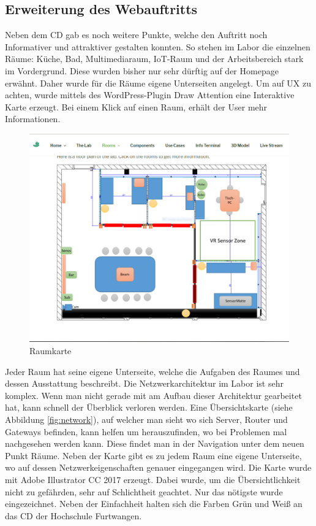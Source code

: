 \subsection{Erweiterung des Webauftritts}
Neben dem \acf{CD} gab es noch weitere Punkte, welche den Auftritt noch Informativer und attraktiver gestalten konnten. So stehen im Labor die einzelnen Räume: Küche, Bad, Multimediaraum, IoT-Raum und der Arbeitsbereich stark im Vordergrund. Diese wurden bisher nur sehr dürftig auf der Homepage erwähnt. Daher wurde für die Räume eigene Unterseiten angelegt. Um auf \acf{UX} zu achten, wurde mittels des WordPress-Plugin Draw Attention  eine Interaktive Karte erzeugt. Bei einem Klick auf einen Raum, erhält der User mehr Informationen. \autocite{WPDrawAttention.}

\begin{figure}[H]
	\centering
	\includegraphics[scale=0.35]{content/pictures/room.jpg}
	\caption{Raumkarte}
	\label{fig:room}
\end{figure}

Jeder Raum hat seine eigene Unterseite, welche die Aufgaben des Raumes und dessen Ausstattung beschreibt.
\newpage
Die Netzwerkarchitektur im Labor ist sehr komplex. Wenn man nicht gerade mit am Aufbau dieser Architektur gearbeitet hat, kann schnell der Überblick verloren werden. Eine Übersichtskarte (siehe Abbildung \ref{fig:network}), auf welcher man sieht wo sich Server, Router und Gateways befinden, kann helfen um herauszufinden, wo bei Problemen mal nachgesehen werden kann. Diese findet man in der Navigation unter dem neuen Punkt Räume. Neben der Karte gibt es zu jedem Raum eine eigene Unterseite, wo auf dessen Netzwerkeigenschaften genauer eingegangen wird. Die Karte wurde mit Adobe Illustrator CC 2017 erzeugt. Dabei wurde, um die Übersichtlichkeit nicht zu gefährden, sehr auf Schlichtheit geachtet. Nur das nötigste wurde eingezeichnet. Neben der Einfachheit halten sich die Farben Grün und Weiß an das \ac{CD} der Hochschule Furtwangen.

